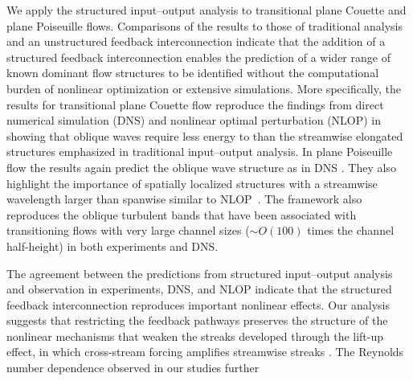 We apply the structured input--output analysis to transitional plane Couette and plane Poiseuille flows. Comparisons of the results to those of traditional analysis and an unstructured feedback interconnection indicate that the addition of a structured feedback interconnection enables the prediction of a wider range of known dominant flow structures to be identified without the computational burden of nonlinear optimization or extensive simulations. More specifically, the results for transitional plane Couette flow reproduce the findings from direct numerical simulation (DNS) \citep{reddy1998stability} and nonlinear optimal perturbation (NLOP) \citep{rabin2012triggering} in showing that oblique waves require less energy to  than the streamwise elongated structures emphasized in traditional input--output analysis. In plane Poiseuille flow the results again predict the oblique wave structure as in DNS \citep{reddy1998stability}. They also highlight the importance of spatially localized structures with a streamwise wavelength larger than spanwise similar to NLOP~\citep{farano2015hairpin}. The framework also reproduces the oblique turbulent bands \citep{prigent2003long,kanazawa2018lifetime} that have been associated with transitioning flows with very large channel sizes  ($\sim O(100)$ times the channel half-height) in both experiments and DNS.



The agreement between the predictions from structured input--output analysis and observation in experiments, DNS, and NLOP indicate that the structured feedback interconnection reproduces  important nonlinear effects. Our analysis suggests that restricting the feedback pathways preserves the structure of the nonlinear mechanisms that weaken the streaks developed through the lift-up effect, in which cross-stream forcing amplifies streamwise streaks \citep{ellingsen1975stability,landahl1975wave,Brandt2014}.  The Reynolds number dependence observed in our studies further  




